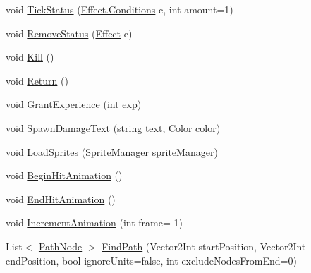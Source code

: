 \begin{DoxyCompactItemize}
\item 
void \mbox{\hyperlink{class_base_unit_af140c1094709a0a90f84d52a4ee80d90}{Tick\+Status}} (\mbox{\hyperlink{class_effect_ab13a718053e330a11f9f66a9b16f4686}{Effect.\+Conditions}} c, int amount=1)
\item 
void \mbox{\hyperlink{class_base_unit_a15cf13fa9b4b776f474ad03b42939139}{Remove\+Status}} (\mbox{\hyperlink{class_effect}{Effect}} e)
\item 
void \mbox{\hyperlink{class_base_unit_ae32912e26fcd7ea4b251045742064af4}{Kill}} ()
\item 
void \mbox{\hyperlink{class_base_unit_a3091e5ab7a6bd3488f9c0987208a1f4d}{Return}} ()
\item 
void \mbox{\hyperlink{class_base_unit_a38fdc01e0ff77bcc22f10d4ce06d0e25}{Grant\+Experience}} (int exp)
\item 
void \mbox{\hyperlink{class_base_unit_aacee7b4acfdd28621f3a1b66bf8d646a}{Spawn\+Damage\+Text}} (string text, Color color)
\item 
void \mbox{\hyperlink{class_base_unit_ab93bf1d3c3ca2899d591a936760d46cf}{Load\+Sprites}} (\mbox{\hyperlink{class_sprite_manager}{Sprite\+Manager}} sprite\+Manager)
\item 
void \mbox{\hyperlink{class_base_unit_a01c63c5cd0d41b5ca787470fd0c19472}{Begin\+Hit\+Animation}} ()
\item 
void \mbox{\hyperlink{class_base_unit_ac451e0e35631687d8a40a20ce68e0e51}{End\+Hit\+Animation}} ()
\item 
void \mbox{\hyperlink{class_base_unit_a007c44552627a4ee773771383198077f}{Increment\+Animation}} (int frame=-\/1)
\item 
List$<$ \mbox{\hyperlink{class_path_node}{Path\+Node}} $>$ \mbox{\hyperlink{class_base_unit_a7adf93eb6a52235a25e1344e401d05d2}{Find\+Path}} (Vector2\+Int start\+Position, Vector2\+Int end\+Position, bool ignore\+Units=false, int exclude\+Nodes\+From\+End=0)
\end{DoxyCompactItemize}
